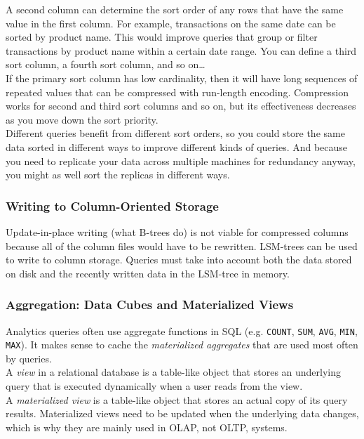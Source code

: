 \documentclass[12pt, titlepage]{article}
\begin{document}
A second column can determine the sort order of any rows that have the same value in the first column. For example, transactions on the same date can be sorted by product name. This would improve queries that group or filter transactions by product name within a certain date range. You can define a third sort column, a fourth sort column, and so on\dots \\

 If the primary sort column has low cardinality, then it will have long sequences of repeated values that can be compressed with run-length encoding. Compression works for second and third sort columns and so on, but its effectiveness decreases as you move down the sort priority. \\

 Different queries benefit from different sort orders, so you could store the same data sorted in different ways to improve different kinds of queries. And because you need to replicate your data across multiple machines for redundancy anyway, you might as well sort the replicas in different ways.

\subsubsection{Writing to Column-Oriented Storage}

Update-in-place writing (what B-trees do) is not viable for compressed columns because all of the column files would have to be rewritten. LSM-trees can be used to write to column storage. Queries must take into account both the data stored on disk and the recently written data in the LSM-tree in memory.

\subsubsection{Aggregation: Data Cubes and Materialized Views}

Analytics queries often use aggregate functions in SQL (e.g. \texttt{COUNT}, \texttt{SUM}, \texttt{AVG}, \texttt{MIN}, \texttt{MAX}). It makes sense to cache the \textit{materialized aggregates} that are used most often by queries. \\

A \textit{view} in a relational database is a table-like object that stores an underlying query that is executed dynamically when a user reads from the view. \\

A \textit{materialized view} is a table-like object that stores an actual copy of its query results. Materialized views need to be updated when the underlying data changes, which is why they are mainly used in OLAP, not OLTP, systems. \\
\end{document}
